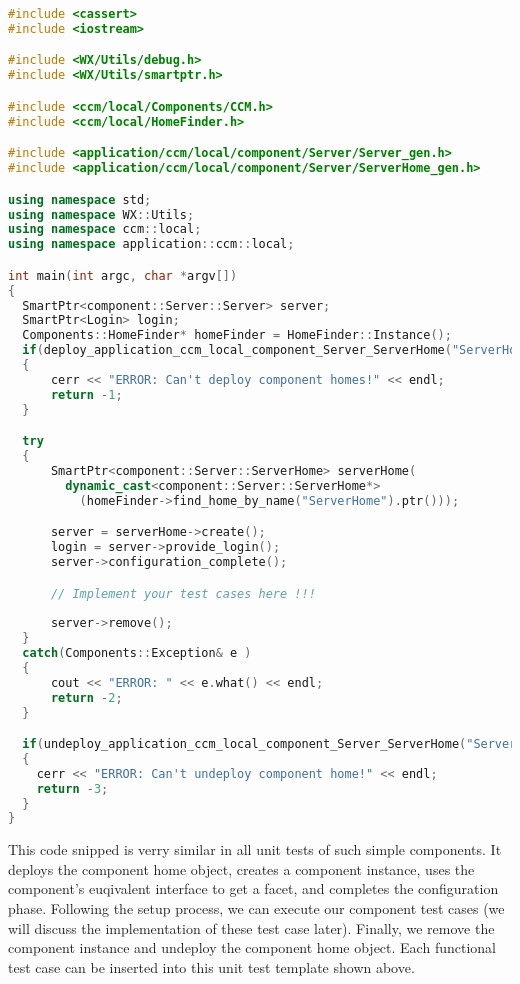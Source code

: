\begin{footnotesize} 
\begin{lstlisting}[language=C++]
#include <cassert>
#include <iostream>

#include <WX/Utils/debug.h>
#include <WX/Utils/smartptr.h>

#include <ccm/local/Components/CCM.h>
#include <ccm/local/HomeFinder.h>

#include <application/ccm/local/component/Server/Server_gen.h>
#include <application/ccm/local/component/Server/ServerHome_gen.h>

using namespace std;
using namespace WX::Utils;
using namespace ccm::local;
using namespace application::ccm::local;

int main(int argc, char *argv[])
{
  SmartPtr<component::Server::Server> server;
  SmartPtr<Login> login;
  Components::HomeFinder* homeFinder = HomeFinder::Instance();
  if(deploy_application_ccm_local_component_Server_ServerHome("ServerHome")) 
  {
      cerr << "ERROR: Can't deploy component homes!" << endl;
      return -1;
  }

  try 
  {
      SmartPtr<component::Server::ServerHome> serverHome(
        dynamic_cast<component::Server::ServerHome*>
          (homeFinder->find_home_by_name("ServerHome").ptr()));

      server = serverHome->create();
      login = server->provide_login();
      server->configuration_complete();

      // Implement your test cases here !!!
    
      server->remove();
  } 
  catch(Components::Exception& e ) 
  {
      cout << "ERROR: " << e.what() << endl;
      return -2;
  } 

  if(undeploy_application_ccm_local_component_Server_ServerHome("ServerHome")) 
  {
    cerr << "ERROR: Can't undeploy component home!" << endl;
    return -3;
  }
}
\end{lstlisting}
\end{footnotesize}

This code snipped is verry similar in all unit tests of such simple components.
It deploys the component home object, creates a component instance, uses 
the component's euqivalent interface to get a facet, and completes the
configuration phase. 
Following the setup process, we can execute our component test cases (we will
discuss the implementation of these test case later).
Finally, we remove the component instance and undeploy the component home object.
Each functional test case can be inserted into this unit test template shown above.


